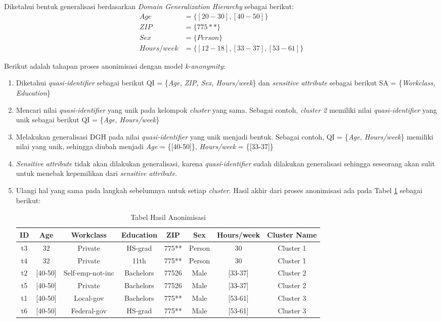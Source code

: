 \noindent Diketahui bentuk generalisasi berdasarkan \textit{Domain Generalization Hierarchy} sebagai berikut:
\begin{align*}
Age &= \{[20-30], [40-50]\}\\
ZIP &= \{775**\}\\
Sex &= \{Person\}\\
Hours/week &=\{[12-18], [33-37], [53-61]\}
\end{align*} 

\vspace{0.2cm}
\noindent Berikut adalah tahapan proses anonimisasi dengan model \textit{k-anonymity}:
\begin{enumerate}

\item Diketahui \textit{quasi-identifier} sebagai berikut QI = \{\textit{Age, ZIP, Sex, Hours/week}\} dan \textit{sensitive attribute} sebagai berikut SA = \{\textit{Workclass, Education}\}

\item Mencari nilai \textit{quasi-identifier} yang unik pada kelompok \textit{cluster} yang sama. Sebagai contoh, \textit{cluster 2} memiliki nilai \textit{quasi-identifier} yang unik sebagai berikut QI = \{\textit{Age, Hours/week}\}

\item Melakukan generalisasi DGH pada nilai \textit{quasi-identifier} yang unik menjadi bentuk. Sebagai contoh, QI = \{\textit{Age, Hours/week}\} memiliki nilai yang unik, sehingga diubah menjadi \textit{Age} = \{[40-50]\}, \textit{Hours/week} = \{[33-37]\}

\item \textit{Sensitive attribute} tidak akan dilakukan generalisasi, karena \textit{quasi-identifier} sudah dilakukan generalisasi sehingga seseorang akan sulit untuk menebak kepemilikan dari \textit{sensitive attribute}.

\item Ulangi hal yang sama pada langkah sebelumnya untuk setiap \textit{cluster}. Hasil akhir dari proses anonimisasi ada pada Tabel \ref{table:anonimisasi} sebagai berikut: 
\begin{table}[H]
\centering
\caption{Tabel Hasil Anonimisasi}
\begin{tabular}{c c c c c c c c}
\hline 
ID & Age & Workclass & Education & ZIP & Sex & Hours/week & Cluster Name\\ 
\hline 
t3 & 32 & Private & HS-grad & 775** & Person & 30 & Cluster 1 \\ 
t4 & 32 & Private & 11th & 775** & Person & 30 & Cluster 1 \\ 
\hline 
t2 & [40-50] & Self-emp-not-inc & Bachelors & 77526 & Male & [33-37] & Cluster 2 \\ 
t5 & [40-50] & Private & Bachelors & 77526 & Male & [33-37]	& Cluster 2\\ 
\hline 
t1 & [40-50] & Local-gov & Bachelors & 775** & Male & [53-61] & Cluster 3\\ 
t6 & [40-50] & Federal-gov & HS-grad & 775** & Male & [53-61] & Cluster 3\\ 
\hline 
\end{tabular} 
\label{table:anonimisasi}
\end{table}


\end{enumerate}
